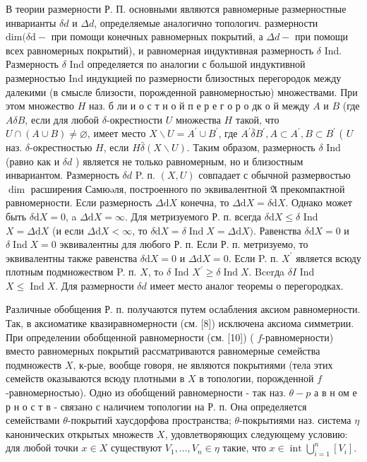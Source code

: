 \documentclass[10pt]{article}
\begin{document}
В теории размерности Р. П. основными являются равномерные размерностные инварианты $\delta d$ и $\Delta d$, определяемые аналогично топологич. размерности $\mathrm{dim}(\delta \mathrm{d}-$ при помощи конечных равномерных покрытий, а $\Delta d-$ при помощи всех равномерных покрытий), и равномерная индуктивная размерность $\delta$ Ind. Размерность $\delta$ Ind определяется по аналогии с большой индуктивной размерностью Ind индукцией по размерности близостных перегородок между далекими (в смысле близости, порожденной равномерностью) множествами. При этом множество $H$ наз. б ли и о с т н о й п е р е г о р о дк о й между $A$ и $B$ (где $A \delta B$, если для любой $\delta$-окрестности $U$ множества $H$ такой, что $U \cap(A \cup B) \neq \varnothing$, имеет место $X \backslash U=A^{\prime} \cup B^{\prime}$, где $A^{\prime} \bar{\delta} B^{\prime}, A \subset A^{\prime}, B \subset B^{\prime}$ ( $U$ наз. $\delta$-окрестностью $H$, если $H \bar{\delta}(X \backslash U)$. Таким образом, размерность $\delta$ Ind (равно как и $\delta d$ ) является не только равномерным, но и близостным инвариантом. Размерность $\delta d$ P. п. $(X, U)$ совпадает с обычной размервостью $\operatorname{dim}$ расширения Самюəля, построенного по эквивалентной $\mathfrak{A}$ прекомпактной равномерности. Если размерность $\Delta \mathrm{d} X$ конечна, то $\Delta \mathrm{d} X=\delta \mathrm{d} X$. Однако может быть $\delta \mathrm{d} X=0$, a $\Delta \mathrm{d} X=\infty$. Для метризуемого Р. п. всегда $\delta \mathrm{d} X \leqslant \delta$ Ind $X=\Delta \mathrm{d} X$ (и если $\Delta \mathrm{d} X<\infty$, то $\delta \mathrm{d} X=\delta \operatorname{Ind} X=\Delta \mathrm{d} X)$. Равенства $\delta \mathrm{d} X=0$ и $\delta \operatorname{Ind} X=0$ эквивалентны для любого Р. п. Если Р. п. метризуемо, то эквивалентны также равенства $\delta \mathrm{d} X=0$ и $\Delta \mathrm{d} X=0$. Если P. п. $X^{\prime}$ является всюду плотным подмножеством P. п. $X$, тo $\delta$ Ind $X^{\prime} \geqslant \delta \operatorname{Ind} X$. Bcerдa $\delta I$ Ind $X \leqslant \operatorname{Ind} X$. Для размерности $\delta d$ имеет место аналог теоремы о перегородках.



Различные обобщения Р. п. получаются путем ослабления аксиом равномерности. Так, в аксиоматике квазиравномерности (см. [8]) исключена аксиома симметрии. При определении обобщенной равномерности (см. [10]) ( $f$-равномерности) вместо равномерных покрытий рассматриваются равномерные семейства подмножеств $X$, к-рые, вообще говоря, не являются покрытиями (тела этих семейств оказываются всюду плотными в $X$ в топологии, порожденной $f$-равномерностью). Одно из обобщений равномерности - так наз. $\theta-p$ а в н ом е р н о с т в - связано с наличием топологии на Р. п. Она определяется семействами $\theta$-покрытий хаусдорфова пространства; $\theta$-покрытиями наз. система $\eta$ канонических открытых множеств $X$, удовлетворяющих следующему условию: для любой точки $x \in X$ существуют $V_{1}, \ldots, V_{n} \in \eta$ такие, что $x \in \operatorname{int} \bigcup_{i=1}^{n}\left[V_{i}\right]$.
\end{document}
